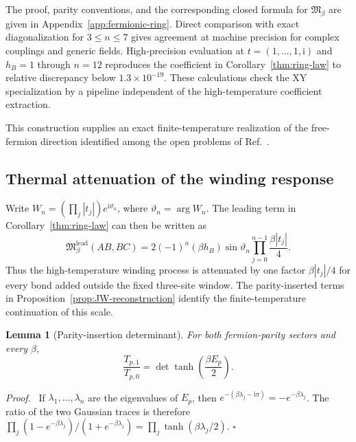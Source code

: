 \documentclass[11pt]{article}
\newcommand{\Mmod}{\mathfrak{M}}
\newcommand{\ii}{\mathrm{i}}
\newtheorem{lemma}[theorem]{Lemma}
\newenvironment{proof}{\par\noindent\textit{Proof.}\ }%
{\unskip\nobreak\hfill\(\square\)\par}
\begin{document}
The proof, parity conventions, and the corresponding closed formula for
$\Mmod_\beta$ are given in Appendix~\ref{app:fermionic-ring}.  Direct
comparison with exact diagonalization for $3\le n\le7$ gives agreement at
machine precision for complex couplings and generic fields.  High-precision
evaluation at $t=(1,\ldots,1,\ii)$ and $h_B=1$ through $n=12$ reproduces the
coefficient in Corollary~\ref{thm:ring-law} to relative discrepancy below
$1.3\times10^{-19}$.  These calculations check the XY specialization by a
pipeline independent of the high-temperature coefficient extraction.

This construction supplies an exact finite-temperature realization of the
free-fermion direction identified among the open problems of
Ref.~\cite{KimEtAl2022PRB}.

\subsection{Thermal attenuation of the winding response}
\label{sec:ring-attenuation}

Write $W_n=(\prod_j|t_j|)e^{\ii\vartheta_n}$, where
$\vartheta_n=\arg W_n$.  The leading term in
Corollary~\ref{thm:ring-law} can then be written as
\begin{equation}
 \Mmod_\beta^{\mathrm{lead}}(AB,BC)
 =2(-1)^n(\beta h_B)\sin\vartheta_n
 \prod_{j=0}^{n-1}\frac{\beta|t_j|}{4}.
 \label{eq:ring-product-form}
\end{equation}
Thus the high-temperature winding process is attenuated by one factor
$\beta|t_j|/4$ for every bond added outside the fixed three-site window.
The parity-inserted terms in Proposition~\ref{prop:JW-reconstruction}
identify the finite-temperature continuation of this scale.

\begin{lemma}[Parity-insertion determinant]
\label{lem:parity-determinant}
For both fermion-parity sectors and every $\beta$,
\begin{equation}
 \frac{T_{p,1}}{T_{p,0}}
 =\det\tanh\!\left(\frac{\beta E_p}{2}\right).
 \label{eq:parity-determinant}
\end{equation}
\end{lemma}

\begin{proof}
If $\lambda_1,\ldots,\lambda_n$ are the eigenvalues of $E_p$, then
$e^{-(\beta\lambda_j-\ii\pi)}=-e^{-\beta\lambda_j}$.  The ratio of the
two Gaussian traces is therefore
$\prod_j(1-e^{-\beta\lambda_j})/(1+e^{-\beta\lambda_j})
=\prod_j\tanh(\beta\lambda_j/2)$.
\end{proof}
\end{document}
